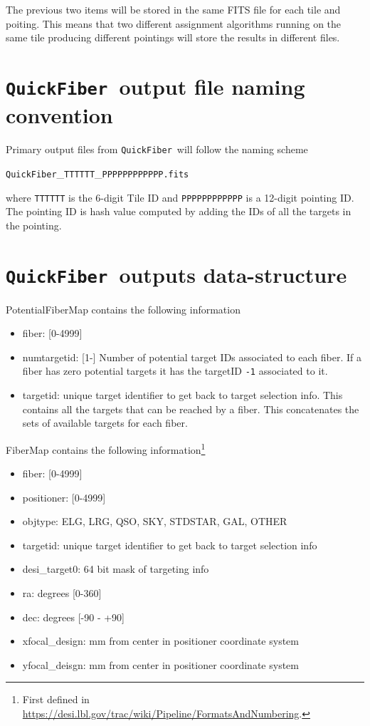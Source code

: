 \documentclass{article}
\newcommand{\code}{{\texttt{QuickFiber}}}
\begin{document}
The previous two items will be stored in the same FITS file for each
tile and poiting. This means that two different assignment algorithms
running on the same tile producing different pointings will store
the results in different files. 

\section{\code\ output file naming convention}

Primary output files from \code\ will follow the naming scheme

\begin{center}
\code\_{\texttt{TTTTTT}}\_{\texttt{PPPPPPPPPPPP.fits}}
\end{center}
\noindent
where \texttt{TTTTTT} is the 6-digit Tile ID and \texttt{PPPPPPPPPPPP} is
a 12-digit pointing ID. The pointing ID is hash value computed by
adding the IDs of all the targets in the pointing. 

\section{\code\ outputs data-structure}


PotentialFiberMap contains the following information
\begin{itemize}
\item fiber: [0-4999]
\item numtargetid: [1-] Number of potential target IDs associated to each
  fiber. If a fiber has zero potential targets it has the
  targetID \texttt{-1} associated to it. 
\item targetid:  unique target identifier to get back to target
      selection info. This contains  all the targets that can be
      reached by a fiber. This concatenates the sets of available
      targets for each fiber.
\end{itemize}

\noindent
FiberMap contains the following information\footnote{First defined in
  \url{https://desi.lbl.gov/trac/wiki/Pipeline/FormatsAndNumbering}.} 
\begin{itemize}
    \item fiber: [0-4999]
    \item positioner: [0-4999]
    \item objtype: ELG, LRG, QSO, SKY, STDSTAR, GAL, OTHER
    \item targetid: 
      unique target identifier to get back to target
      selection info 
    \item desi\_target0: 64 bit mask of targeting info 
    \item ra: degrees [0-360] 
    \item dec: degrees [-90 - +90] 
    \item xfocal\_design: mm from center in positioner coordinate system 
    \item yfocal\_deisgn: mm from center in positioner coordinate system  
\end{itemize}
\end{document}
